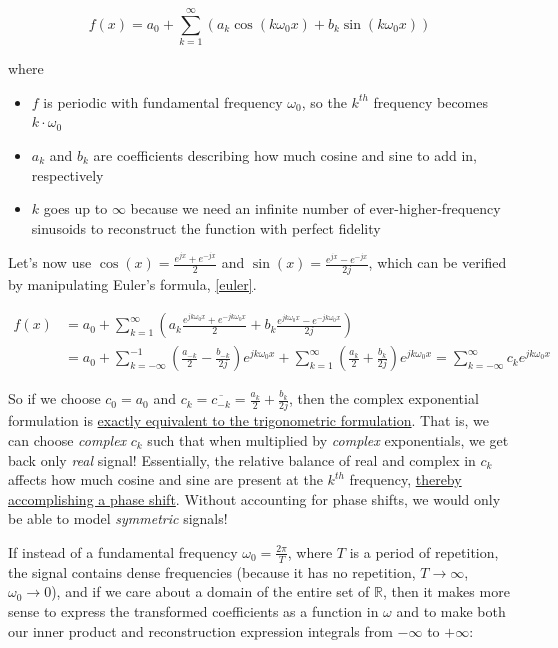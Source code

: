 \documentclass[10pt]{article}
\begin{document}
$$ f(x) = a_0 + \sum_{k=1}^{\infty} (a_k \cos(k \omega_0 x) + b_k \sin(k \omega_0 x))$$

where
\begin{itemize}[noitemsep, topsep=0pt, after=\newline]
	\item $f$ is periodic with fundamental frequency $\omega_0$, so the $k^{th}$ frequency becomes $k \cdot \omega_0$
	\item $a_k$ and $b_k$ are coefficients describing how much cosine and sine to add in, respectively
	\item $k$ goes up to $\infty$ because we need an infinite number of ever-higher-frequency sinusoids to reconstruct the function with perfect fidelity
\end{itemize}

Let's now use $\cos(x) = \frac{e^{jx} + e^{-jx}}{2}$ and $\sin(x) = \frac{e^{jx} - e^{-jx}}{2j}$, which can be verified by manipulating Euler's formula, \autoref{euler}.

\begin{align*}
f(x) &= a_0 + \sum_{k=1}^{\infty} (a_k \frac{e^{j k \omega_0 x} + e^{-j k \omega_0 x}}{2} + b_k \frac{e^{j k \omega_0 x} - e^{-j k \omega_0 x}}{2j}) \\
&= a_0 + \sum_{k = -\infty}^{-1} (\frac{a_{-k}}{2} - \frac{b_{-k}}{2j}) e^{j k \omega_0 x} + \sum_{k = 1}^{\infty} (\frac{a_k}{2} + \frac{b_k}{2j}) e^{j k \omega_0 x} = \sum_{k = -\infty}^{\infty} c_k e^{j k \omega_0 x}
\end{align*}

So if we choose $c_0 = a_0$ and $c_k = \overline{c_{-k}} = \frac{a_k}{2} + \frac{b_k}{2j}$, then the complex exponential formulation is \href{http://lpsa.swarthmore.edu/Fourier/Series/DerFS.html}{exactly equivalent to the trigonometric formulation}\cite{swarthmore}. That is, we can choose \textit{complex} $c_k$ such that when multiplied by \textit{complex} exponentials, we get back only \textit{real} signal! Essentially, the relative balance of real and complex in $c_k$ affects how much cosine and sine are present at the $k^{th}$ frequency, \href{https://dsego.github.io/demystifying-fourier/}{thereby accomplishing a phase shift}\cite{sego}. Without accounting for phase shifts, we would only be able to model \textit{symmetric} signals!

If instead of a fundamental frequency $\omega_0 = \frac{2\pi}{T}$, where $T$ is a period of repetition, the signal contains dense frequencies (because it has no repetition, $T \rightarrow \infty$, $\omega_0 \rightarrow 0$), and if we care about a domain of the entire set of $\mathbb{R}$, then it makes more sense to express the transformed coefficients as a function in $\omega$ and to make both our inner product and reconstruction expression integrals from $-\infty$ to $+\infty$:
\end{document}
